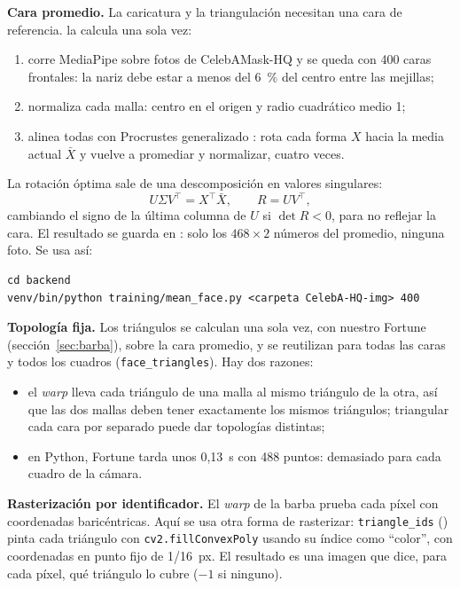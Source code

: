 \textbf{Cara promedio.} La caricatura y la triangulación necesitan una cara de referencia.  la calcula una sola vez:
\begin{enumerate}
  \item corre MediaPipe sobre fotos de CelebAMask-HQ \cite{lee2020} y se queda con 400 caras frontales: la nariz debe estar a menos del 6~\% del centro entre las mejillas;
  \item normaliza cada malla: centro en el origen y radio cuadrático medio 1;
  \item alinea todas con Procrustes generalizado \cite{gower1975}: rota cada forma $X$ hacia la media actual $\bar X$ y vuelve a promediar y normalizar, cuatro veces.
\end{enumerate}
La rotación óptima sale de una descomposición en valores singulares:
\begin{equation}
  U\Sigma V^\top = X^\top\bar X,\qquad R=UV^\top,
\end{equation}
cambiando el signo de la última columna de $U$ si $\det R<0$, para no reflejar la cara. El resultado se guarda en : solo los $468\times2$ números del promedio, ninguna foto. Se usa así:
\begin{lstlisting}
cd backend
venv/bin/python training/mean_face.py <carpeta CelebA-HQ-img> 400
\end{lstlisting}

\textbf{Topología fija.} Los triángulos se calculan una sola vez, con nuestro Fortune (sección~\ref{sec:barba}), sobre la cara promedio, y se reutilizan para todas las caras y todos los cuadros (\texttt{face\_triangles}). Hay dos razones:
\begin{itemize}
  \item el \emph{warp} lleva cada triángulo de una malla al mismo triángulo de la otra, así que las dos mallas deben tener exactamente los mismos triángulos; triangular cada cara por separado puede dar topologías distintas;
  \item en Python, Fortune tarda unos 0{,}13~s con 488 puntos: demasiado para cada cuadro de la cámara.
\end{itemize}

\textbf{Rasterización por identificador.} El \emph{warp} de la barba prueba cada píxel con coordenadas baricéntricas. Aquí se usa otra forma de rasterizar: \texttt{triangle\_ids} () pinta cada triángulo con \texttt{cv2.fillConvexPoly} usando su índice como ``color'', con coordenadas en punto fijo de 1/16~px. El resultado es una imagen que dice, para cada píxel, qué triángulo lo cubre ($-1$ si ninguno).

